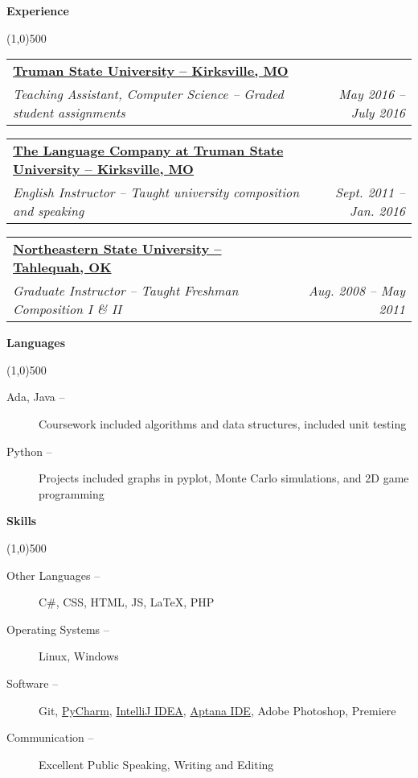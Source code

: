 \documentclass[letterpaper,11pt]{article}
\makeatletter
\newcommand{\resheading}[1]{{\large {\begin{minipage}{\textwidth}{\textbf{#1 \vphantom{p\^{E}}}}\end{minipage}}}}
\newcommand{\ressubheading}[4]
{\begin{tabular*}{6.8in}{l@{\extracolsep{\fill}}r}
		\textbf{#1} & #2 \\
		\textit{#3} & \textit{#4} \\
\end{tabular*}\vspace{-6pt}}
\makeatother
\begin{document}

\resheading{Experience}

\line(1,0){500}
	\begin{description}
	
			\item 
			\ressubheading{\href{http://www.truman.edu}{Truman State University -- Kirksville, MO}}{}
				{Teaching Assistant, Computer Science -- Graded student assignments}{ \footnotesize{May 2016 -- July 2016}}


		\item 
			\ressubheading{\href{http://www.thelanguagecompany.com}{The Language Company at Truman State University -- Kirksville, MO}}{}
				{English Instructor -- Taught university composition and speaking}{ \footnotesize{Sept. 2011 -- Jan. 2016}}

		\item
			\ressubheading{\href{http://www.nsuok.edu}{Northeastern State University -- Tahlequah, OK}}{}
				{Graduate Instructor -- Taught Freshman Composition I \& II}{ \footnotesize{Aug. 2008 -- May 2011}}


	\end{description}  %



\resheading{Languages}

\line(1,0){500}

		
		\begin{description}
		    \item [Ada, Java --] Coursework included algorithms and data structures, included unit testing
		    \item [Python --] Projects included graphs in pyplot, Monte Carlo simulations, and 2D game programming 
		\end{description}
		
	
\resheading{Skills}

\line(1,0){500}

	\begin{description}
    	\item[Other Languages --] C\#, CSS, HTML, JS, \LaTeX , PHP

		\item[Operating Systems --]
			Linux, Windows
	
		
		\item[Software --] Git, \href{http://www.jetbrains.com/pycharm/}{PyCharm},
		\href{http://www.jetbrains.com/idea/}{IntelliJ IDEA},
		\href{http://www.aptana.com/}{Aptana IDE}, Adobe Photoshop, Premiere


		\item[Communication --] 
			Excellent Public Speaking, Writing and Editing
	
	\end{description} %
\end{document}
